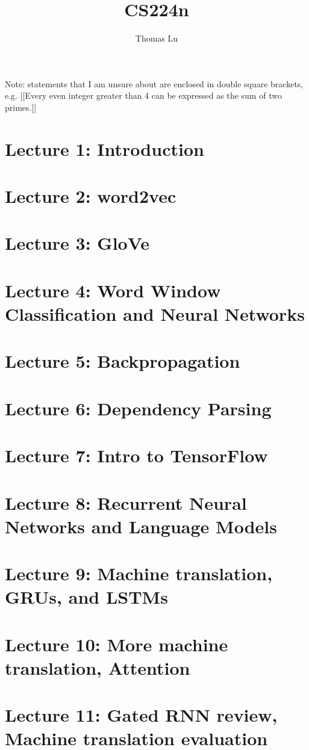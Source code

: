 \documentclass{article}
\title{CS224n}
\author{Thomas Lu}
\date{}
\begin{document}
\maketitle
Note: statements that I am unsure about are enclosed in double square brackets, e.g. [[Every even integer greater than 4 can be expressed as the sum of two primes.]]
\section{Lecture 1: Introduction}

\section{Lecture 2: word2vec}

\section{Lecture 3: GloVe}

\section{Lecture 4: Word Window Classification and Neural Networks}

\section{Lecture 5: Backpropagation}

\section{Lecture 6: Dependency Parsing}

\section{Lecture 7: Intro to TensorFlow}

\section{Lecture 8: Recurrent Neural Networks and Language Models}

\section{Lecture 9: Machine translation, GRUs, and LSTMs}

\section{Lecture 10: More machine translation, Attention}

\section{Lecture 11: Gated RNN review, Machine translation evaluation}

\end{document}
